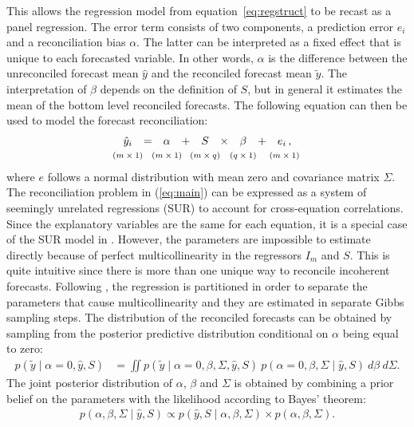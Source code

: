 \documentclass[a4paper,fleqn,11pt]{article}
\begin{document}
This allows the regression model from equation~\eqref{eq:regstruct} to be recast as a panel regression. The error term consists of two components, a prediction error $e_{i}$ and a reconciliation bias $\alpha$. The latter can be interpreted as a fixed effect that is unique to each forecasted variable. In other words, $\alpha$ is the difference between the unreconciled forecast mean $\hat{y}$ and the reconciled forecast mean $\tilde{y}$. The interpretation of $\beta$ depends on the definition of $S$, but in general it estimates the mean of the bottom level reconciled forecasts. The following equation can then be used to model the forecast reconciliation:
\begin{equation}
\label{eq:main}
\begin{array}{ccccccccc}
	\hat{y}_i & = & \alpha & + &S & \times & \beta & + & e_i\,, \\
	\clap{(m\times 1)} & & \clap{(m\times 1)} & & \clap{(m\times q)}  & & \clap{(q\times 1)} & & \clap{(m\times 1)}
\end{array}
\end{equation}
where $e$ follows a normal distribution with mean zero and covariance matrix $\Sigma$. The reconciliation problem in (\ref{eq:main}) can be expressed as a system of seemingly unrelated regressions (SUR) to account for cross-equation correlations. Since the explanatory variables are the same for each equation, it is a special case of the SUR model in \cite{Zellner1962}. However, the parameters are impossible to estimate directly because of perfect multicollinearity in the regressors $I_m$ and $S$. This is quite intuitive since there is more than one unique way to reconcile incoherent forecasts. Following \cite{Farebrother1978}, the regression is partitioned in order to separate the parameters that cause multicollinearity and they are estimated in separate Gibbs sampling steps. The distribution of the reconciled forecasts can be obtained by sampling from the posterior predictive distribution conditional on $\alpha$ being equal to zero:
\begin{align*}
p(\tilde{y} \mid \alpha = 0,\hat{y}, S) &= \iint p(\tilde{y} \mid \alpha = 0,\beta,\Sigma,\hat{y},S)\ p(\alpha = 0,\beta,\Sigma\mid \hat{y},S)\ d\beta\ d\Sigma.
\end{align*}
The joint posterior distribution of $\alpha$, $\beta$ and $\Sigma$ is obtained by combining a prior belief on the parameters with the likelihood according to Bayes' theorem:
\begin{align}
p(\alpha, \beta, \Sigma \mid\hat{y}, S) \propto p(\hat{y}, S \mid \alpha, \beta, \Sigma) \times p(\alpha, \beta, \Sigma).
\end{align}
\end{document}
